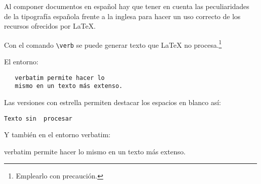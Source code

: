 \documentclass[11pt,a4paper]{article}
\begin{document}
Al componer documentos en español hay que tener en cuenta las peculiaridades de la tipografía española frente a la inglesa para hacer un uso correcto de los recursos ofrecidos por \LaTeX.

\noindent Con el comando \verb+\verb+ se puede generar texto que \LaTeX{} no procesa.\footnote{Emplearlo con precaución.}



El entorno:
\begin{verbatim}
   verbatim permite hacer lo 
   mismo en un texto más extenso.
\end{verbatim} 

Las versiones con estrella permiten destacar los espacios en blanco así:

\verb*|Texto sin  procesar|

Y también en el entorno verbatim:

\begin{verbatim*}
   verbatim permite hacer lo 
   mismo en un texto más extenso.
\end{verbatim*} 
\end{document}
